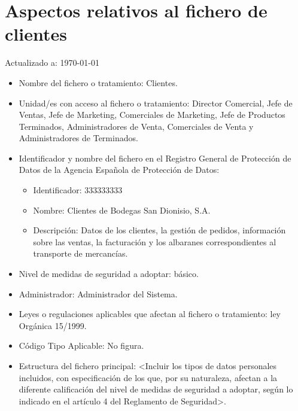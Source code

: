 \documentclass[a4paper,11pt,bibtotoc,noliststotoc]{scrbook}
\newcommand{\laorganizacion}{Bodegas San Dionisio, S.A.}
\begin{document}
\section{Aspectos relativos al fichero de clientes}


Actualizado a: \today

\begin{itemize}
\item Nombre del fichero o tratamiento: Clientes.

\item Unidad/es con acceso al fichero o tratamiento: Director Comercial, Jefe de Ventas, Jefe de Marketing, Comerciales de Marketing, Jefe de Productos Terminados, Administradores de Venta, Comerciales de Venta y Administradores de Terminados.

\item Identificador y nombre del fichero en el Registro General de Protección de Datos de la Agencia Española de Protección de Datos:
	\begin{itemize}
	\item Identificador: 333333333
	\item Nombre: Clientes de \laorganizacion
	\item Descripción: Datos de los clientes, la gestión de pedidos, información sobre las ventas, la facturación y los albaranes correspondientes al transporte de mercancías.
	\end{itemize}

\item Nivel de medidas de seguridad a adoptar: básico.

\item Administrador: Administrador del Sistema.

\item Leyes o regulaciones aplicables que afectan al fichero o tratamiento: ley Orgánica 15/1999.

\item Código Tipo Aplicable: No figura.

\item Estructura del fichero principal: <Incluir los tipos de datos personales incluidos, con especificación de los que, por su naturaleza, afectan a la diferente calificación del nivel de medidas de seguridad a adoptar, según lo indicado en el artículo 4 del Reglamento de Seguridad>.


\end{itemize}
\end{document}
